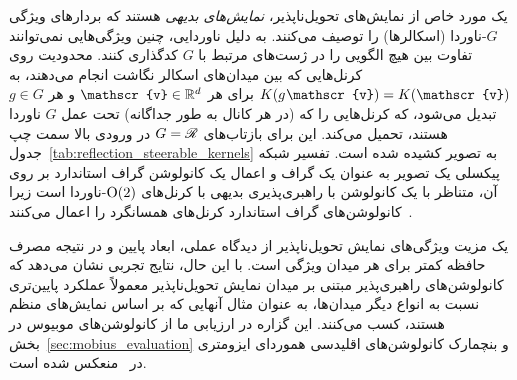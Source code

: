 یک مورد خاص از نمایش‌های تحویل‌ناپذیر، \emph{نمایش‌های بدیهی} هستند که بردارهای ویژگی $G$-ناوردا (اسکالرها) را توصیف می‌کنند.
به دلیل ناوردایی، چنین ویژگی‌هایی نمی‌توانند تفاوت بین هیچ الگویی را در ژست‌های مرتبط با $G$ کدگذاری کنند.
محدودیت روی کرنل‌هایی که بین میدان‌های اسکالر نگاشت انجام می‌دهند، به $K(g\mkern1mu \mathscr{v}) = K(\mathscr{v})$ برای هر $\mathscr{v} \in \R^d$ و هر $g\in G$ تبدیل می‌شود، که کرنل‌هایی را که (در هر کانال به طور جداگانه) تحت عمل $G$ ناوردا هستند، تحمیل می‌کند.
این برای بازتاب‌های $G=\mathscr{R}$ در ورودی بالا سمت چپ جدول~\ref{tab:reflection_steerable_kernels} به تصویر کشیده شده است.
تفسیر شبکه پیکسلی یک تصویر به عنوان یک گراف و اعمال یک کانولوشن گراف استاندارد بر روی آن، متناظر با یک کانولوشن با راهبری‌پذیری بدیهی با کرنل‌های $\operatorname{O}(2)$-ناوردا است زیرا کانولوشن‌های گراف استاندارد کرنل‌های همسانگرد را اعمال می‌کنند~\cite{khasanova2018isometric}.

یک مزیت ویژگی‌های نمایش تحویل‌ناپذیر از دیدگاه عملی، ابعاد پایین و در نتیجه مصرف حافظه کمتر برای هر میدان ویژگی است.
با این حال، نتایج تجربی نشان می‌دهد که کانولوشن‌های راهبری‌پذیر مبتنی بر میدان نمایش تحویل‌ناپذیر معمولاً عملکرد پایین‌تری نسبت به انواع دیگر میدان‌ها، به عنوان مثال آنهایی که بر اساس نمایش‌های منظم هستند، کسب می‌کنند.
این گزاره در ارزیابی ما از کانولوشن‌های موبیوس در بخش~\ref{sec:mobius_evaluation} و بنچمارک کانولوشن‌های اقلیدسی هموردای ایزومتری در~\cite{Weiler2019_E2CNN} منعکس شده است.



